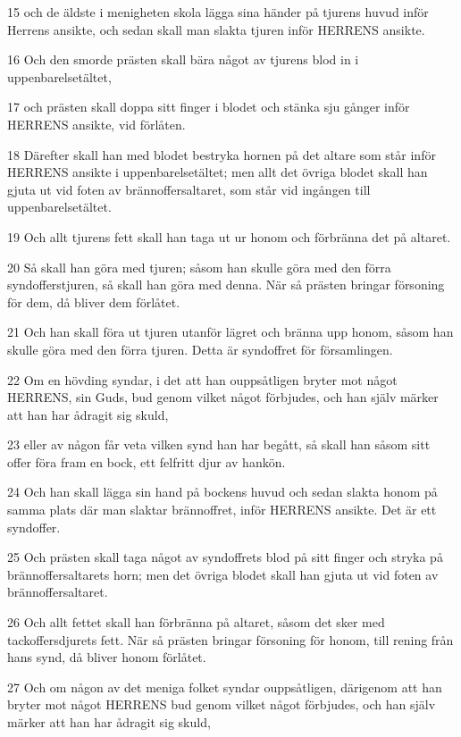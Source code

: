 \par 15 och de äldste i menigheten skola lägga sina händer på tjurens huvud inför Herrens ansikte, och sedan skall man slakta tjuren inför HERRENS ansikte.
\par 16 Och den smorde prästen skall bära något av tjurens blod in i uppenbarelsetältet,
\par 17 och prästen skall doppa sitt finger i blodet och stänka sju gånger inför HERRENS ansikte, vid förlåten.
\par 18 Därefter skall han med blodet bestryka hornen på det altare som står inför HERRENS ansikte i uppenbarelsetältet; men allt det övriga blodet skall han gjuta ut vid foten av brännoffersaltaret, som står vid ingången till uppenbarelsetältet.
\par 19 Och allt tjurens fett skall han taga ut ur honom och förbränna det på altaret.
\par 20 Så skall han göra med tjuren; såsom han skulle göra med den förra syndofferstjuren, så skall han göra med denna. När så prästen bringar försoning för dem, då bliver dem förlåtet.
\par 21 Och han skall föra ut tjuren utanför lägret och bränna upp honom, såsom han skulle göra med den förra tjuren. Detta är syndoffret för församlingen.
\par 22 Om en hövding syndar, i det att han ouppsåtligen bryter mot något HERRENS, sin Guds, bud genom vilket något förbjudes, och han själv märker att han har ådragit sig skuld,
\par 23 eller av någon får veta vilken synd han har begått, så skall han såsom sitt offer föra fram en bock, ett felfritt djur av hankön.
\par 24 Och han skall lägga sin hand på bockens huvud och sedan slakta honom på samma plats där man slaktar brännoffret, inför HERRENS ansikte. Det är ett syndoffer.
\par 25 Och prästen skall taga något av syndoffrets blod på sitt finger och stryka på brännoffersaltarets horn; men det övriga blodet skall han gjuta ut vid foten av brännoffersaltaret.
\par 26 Och allt fettet skall han förbränna på altaret, såsom det sker med tackoffersdjurets fett. När så prästen bringar försoning för honom, till rening från hans synd, då bliver honom förlåtet.
\par 27 Och om någon av det meniga folket syndar ouppsåtligen, därigenom att han bryter mot något HERRENS bud genom vilket något förbjudes, och han själv märker att han har ådragit sig skuld,
